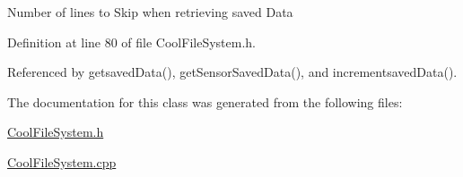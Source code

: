 Number of lines to Skip when retrieving saved Data 

Definition at line 80 of file Cool\+File\+System.\+h.



Referenced by getsaved\+Data(), get\+Sensor\+Saved\+Data(), and incrementsaved\+Data().



The documentation for this class was generated from the following files\+:\begin{DoxyCompactItemize}
\item 
\hyperlink{_cool_file_system_8h}{Cool\+File\+System.\+h}\item 
\hyperlink{_cool_file_system_8cpp}{Cool\+File\+System.\+cpp}\end{DoxyCompactItemize}
